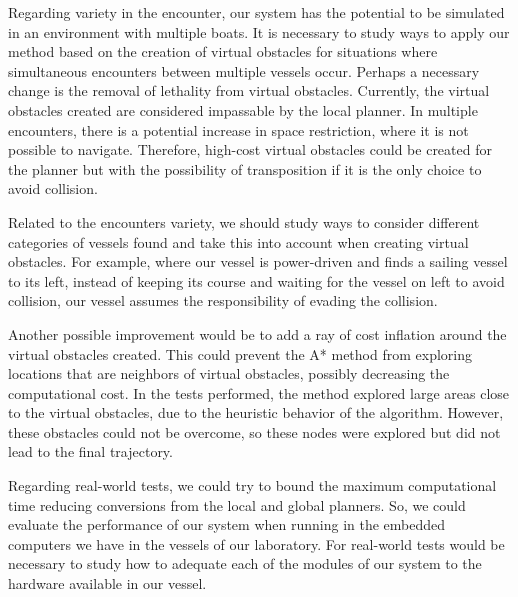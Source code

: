     Regarding variety in the encounter, our system has the potential to be simulated in an environment with multiple boats. It is necessary to study ways to apply our method based on the creation of virtual obstacles for situations where simultaneous encounters between multiple vessels occur. Perhaps a necessary change is the removal of lethality from virtual obstacles. Currently, the virtual obstacles created are considered impassable by the local planner. In multiple encounters, there is a potential increase in space restriction, where it is not possible to navigate. Therefore, high-cost virtual obstacles could be created for the planner but with the possibility of transposition if it is the only choice to avoid collision.
    
    Related to the encounters variety, we should study ways to consider different categories of vessels found and take this into account when creating virtual obstacles. For example, where our vessel is power-driven and finds a sailing vessel to its left, instead of keeping its course and waiting for the vessel on left to avoid collision, our vessel assumes the responsibility of evading the collision.
    
    Another possible improvement would be to add a ray of cost inflation around the virtual obstacles created. This could prevent the A* method from exploring locations that are neighbors of virtual obstacles, possibly decreasing the computational cost. In the tests performed, the method explored large areas close to the virtual obstacles, due to the heuristic behavior of the algorithm. However, these obstacles could not be overcome, so these nodes were explored but did not lead to the final trajectory.
    
     Regarding real-world tests, we could try to bound the maximum computational time reducing conversions from the local and global planners. So, we could evaluate the performance of our system when running in the embedded computers we have in the vessels of our laboratory. For  real-world tests would be necessary to study how to adequate each of the modules of our system to the hardware available in our vessel.
    
    
